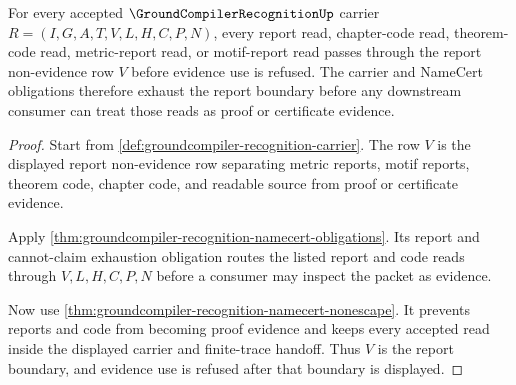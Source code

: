 \begin{theorem}
\label{thm:groundcompiler-recognition-report-boundary-exhaustion}
For every accepted $\GroundCompilerRecognitionUp$ carrier $R=(I,G,A,T,V,L,H,C,P,N)$, every report read, chapter-code read, theorem-code read, metric-report read, or motif-report read passes through the report non-evidence row $V$ before evidence use is refused. The carrier and NameCert obligations therefore exhaust the report boundary before any downstream consumer can treat those reads as proof or certificate evidence.
\end{theorem}
\begin{proof}
Start from \autoref{def:groundcompiler-recognition-carrier}. The row $V$ is the displayed report non-evidence row separating metric reports, motif reports, theorem code, chapter code, and readable source from proof or certificate evidence.

Apply \autoref{thm:groundcompiler-recognition-namecert-obligations}. Its report and cannot-claim exhaustion obligation routes the listed report and code reads through $V,L,H,C,P,N$ before a consumer may inspect the packet as evidence.

Now use \autoref{thm:groundcompiler-recognition-namecert-nonescape}. It prevents reports and code from becoming proof evidence and keeps every accepted read inside the displayed carrier and finite-trace handoff. Thus $V$ is the report boundary, and evidence use is refused after that boundary is displayed.
\end{proof}

